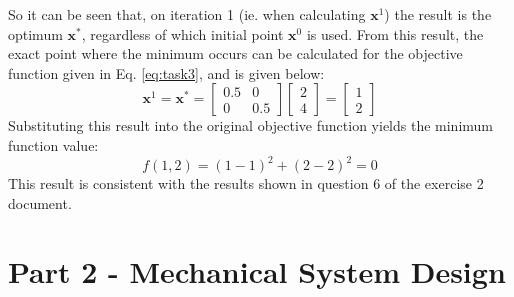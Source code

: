 \documentclass{article}
\begin{document}
\noindent So it can be seen that, on iteration 1 (ie. when calculating $\mathbf{x}^{1}$) the result is the optimum $\mathbf{x}^{*}$, regardless of which initial point $\mathbf{x}^{0}$ is used. From this result, the exact point where the minimum occurs can be calculated for the objective function given in Eq. \ref{eq:task3}, and is given below:
\begin{equation*}
    \mathbf{x}^{1} = \mathbf{x}^{*} = \begin{bmatrix} 0.5 & 0 \\ 0 & 0.5 \end{bmatrix} \begin{bmatrix} 2 \\ 4 \end{bmatrix}  = \begin{bmatrix} 1 \\ 2\end{bmatrix}
\end{equation*}
Substituting this result into the original objective function yields the minimum function value:
\begin{equation*}
    f(1,2) = (1-1)^{2} + (2-2)^{2} = 0
\end{equation*}
This result is consistent with the results shown in question 6 of the exercise 2 document.





\section{Part 2 - Mechanical System Design}
\end{document}

